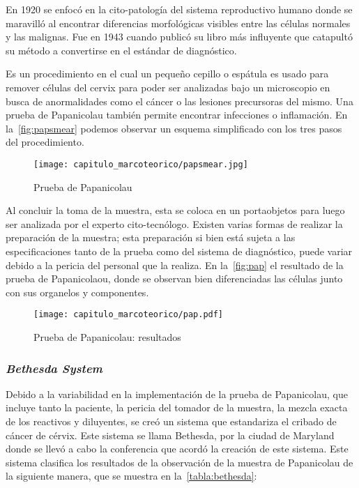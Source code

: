 En 1920 se enfocó en la cito-patología del sistema reproductivo humano donde se
maravilló al encontrar diferencias morfológicas visibles entre las células
normales y las malignas. Fue en 1943 cuando publicó su libro más influyente que
catapultó su método a convertirse en el estándar de diagnóstico.~\cite{Tan2015}

Es un procedimiento en el cual un pequeño cepillo o espátula es usado para
remover células del cervix para poder ser analizadas bajo un microscopio en
busca de anormalidades como el cáncer o las lesiones precursoras del mismo. Una
prueba de Papanicolau también permite encontrar infecciones o inflamación. En
la~\autoref{fig:papsmear} podemos observar un esquema simplificado con los tres pasos
del procedimiento.~\cite{NationalCancerInstitutea}
\begin{figure}[H]
    \centering
    \texttt{[image: capitulo\_marcoteorico/papsmear.jpg]}
    \caption{Prueba de Papanicolau}\label{fig:papsmear}
\end{figure}

Al concluir la toma de la muestra, esta se coloca en un portaobjetos para luego
ser analizada por el experto cito-tecnólogo. Existen varias formas de realizar
la preparación de la muestra; esta preparación si bien está sujeta a las
especificaciones tanto de la prueba como del sistema de diagnóstico, puede
variar debido a la pericia del personal que la realiza. En la~\autoref{fig:pap}
el resultado de la prueba de Papanicolaou, donde se observan bien diferenciadas
las células junto con sus organelos y componentes.

\begin{figure}[H]
    \centering
    \texttt{[image: capitulo\_marcoteorico/pap.pdf]}
    \caption{Prueba de Papanicolau: resultados}\label{fig:pap}
\end{figure}

\subsubsection{\emph{Bethesda System}}

Debido a la variabilidad en la implementación de la prueba de Papanicolau, que
incluye tanto la paciente, la pericia del tomador de la muestra, la mezcla
exacta de los reactivos y diluyentes, se creó un sistema que estandariza el
cribado de cáncer de cérvix. Este sistema se llama Bethesda, por la ciudad de Maryland donde se llevó a cabo la conferencia
que acordó la creación de este sistema. Este sistema clasifica los resultados de
la observación de la muestra de Papanicolau de la siguiente manera, que se
muestra en la~\autoref{tabla:bethesda}:

